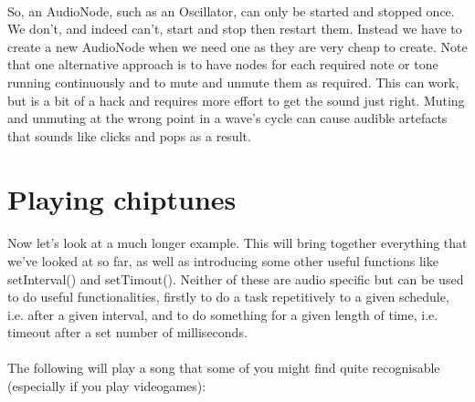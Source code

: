 \paragraph{} So, an AudioNode, such as an Oscillator, can only be started and stopped once. We don’t, and indeed can't, start and stop then restart them. Instead we have to create a new AudioNode when we need one as they are very cheap to create. Note that one alternative approach is to have nodes  for each required note or tone running continuously and to mute and unmute them as required. This can work, but is a bit of a hack and requires more effort to get the sound just right. Muting and unmuting at the wrong point in a wave's cycle can cause audible artefacts that sounds like clicks and pops as a result.


\section{Playing chiptunes}
\paragraph{} Now let's look at a much longer example. This will bring together everything that we've looked at so far, as well as introducing some other useful functions like setInterval() and setTimout(). Neither of these are audio specific but can be used to do useful functionalities, firstly to do a task repetitively to a given schedule, i.e. after a given interval, and to do something for a given length of time, i.e. timeout after a set number of milliseconds.
\paragraph{} The following will play a song that some of you might find quite recognisable (especially if you play videogames):

